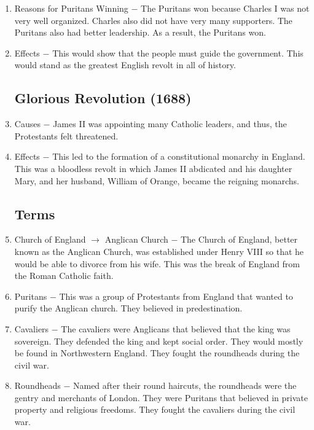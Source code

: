 \documentclass[12pt]{article}
\begin{document}
\begin{enumerate}
\item Reasons for Puritans Winning $-$ The Puritans won because Charles I was not very well organized. Charles also did not have very many supporters. The Puritans also had better leadership. As a result, the Puritans won.

\item Effects $-$ This would show that the people must guide the government. This would stand as the greatest English revolt in all of history.

\subsection{Glorious Revolution (1688)}

\item Causes $-$ James II was appointing many Catholic leaders, and thus, the Protestants felt threatened.

\item Effects $-$ This led to the formation of a constitutional monarchy in England. This was a bloodless revolt in which James II abdicated and his daughter Mary, and her husband, William of Orange, became the reigning monarchs.

\subsection{Terms}

\item Church of England $\rightarrow$ Anglican Church $-$ The Church of England, better known as the Anglican Church, was established under Henry VIII so that he would be able to divorce from his wife. This was the break of England from the Roman Catholic faith.

\item Puritans $-$  This was a group of Protestants from England that wanted to purify the Anglican church. They believed in predestination.

\item Cavaliers $-$ The cavaliers were Anglicans that believed that the king was sovereign. They defended the king and kept social order. They would mostly be found in Northwestern England. They fought the roundheads during the civil war.

\item Roundheads $-$ Named after their round haircuts, the roundheads were the gentry and merchants of London. They were Puritans that believed in private property and religious freedoms. They fought the cavaliers during the civil war.


\end{enumerate}
\end{document}
